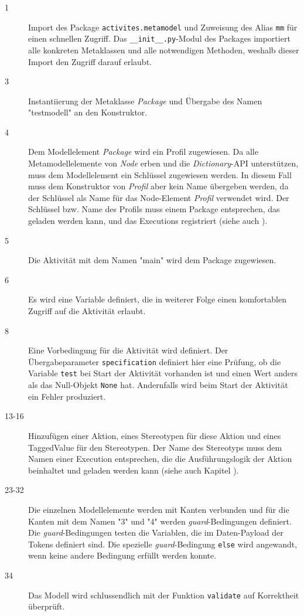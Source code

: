 \begin{description}
\item[1] Import des Package \texttt{activites.metamodel} und Zuweisung des Alias \texttt{mm} für einen schnellen Zugriff. Das \texttt{\_\_init\_\_.py}-Modul des Packages importiert alle konkreten Metaklassen und alle notwendigen Methoden, weshalb dieser Import den Zugriff darauf erlaubt.
\item[3] Instantiierung der Metaklasse \emph{Package} und Übergabe des Namen "testmodell" an den Konstruktor.
\item[4] Dem Modellelement \emph{Package} wird ein Profil zugewiesen. Da alle Metamodellelemente von \emph{Node} erben und die \emph{Dictionary}-API unterstützen, muss dem Modellelement ein Schlüssel zugewiesen werden. In diesem Fall muss dem Konstruktor von \emph{Profil} aber kein Name übergeben werden, da der Schlüssel als Name für das Node-Element \emph{Profil} verwendet wird. Der Schlüssel bzw. Name des Profils muss einem Package entsprechen, das geladen werden kann, und das Executions registriert (siehe auch ).
\item[5] Die Aktivität mit dem Namen "main" wird dem Package zugewiesen.
\item[6] Es wird eine Variable definiert, die in weiterer Folge einen komfortablen Zugriff auf die Aktivität erlaubt.
\item[8] Eine Vorbedingung für die Aktivität wird definiert. Der Übergabeparameter \texttt{specification} definiert hier eine Prüfung, ob die Variable \texttt{test} bei Start der Aktivität vorhanden ist und einen Wert anders als das Null-Objekt \texttt{None} hat. Andernfalls wird beim Start der Aktivität ein Fehler produziert.
\item[13-16] Hinzufügen einer Aktion, eines Stereotypen für diese Aktion und eines TaggedValue für den Stereotypen. Der Name des Stereotyps muss dem Namen einer Execution entsprechen, die die Ausführungslogik der Aktion beinhaltet und geladen werden kann  (siehe auch Kapitel ).
\item[23-32] Die einzelnen Modellelemente werden mit Kanten verbunden und für die Kanten mit dem Namen "3" und "4" werden \emph{guard}-Bedingungen definiert. Die \emph{guard}-Bedingungen testen die Variablen, die im Daten-Payload der Tokens definiert sind. Die spezielle \emph{guard}-Bedingung \texttt{else} wird angewandt, wenn keine andere Bedingung erfüllt werden konnte.
\item[34] Das Modell wird schlussendlich mit der Funktion \texttt{validate} auf Korrektheit überprüft.
\end{description}


